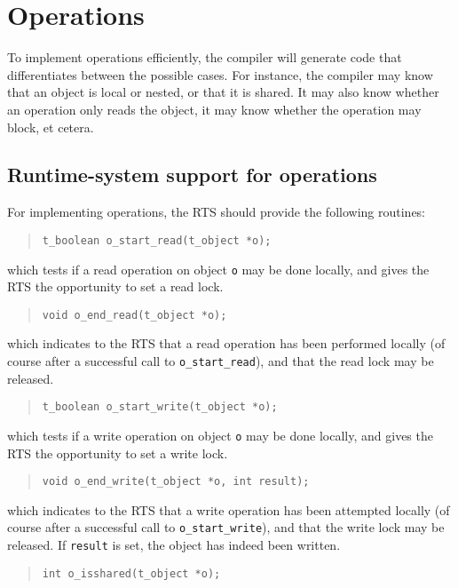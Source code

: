 \documentclass[10pt]{article}
\begin{document}
\section{Operations}\label{sec:ops}
To implement operations efficiently, the compiler will generate code
that differentiates between the possible cases.
For instance, the compiler may know that an object is local or nested,
or that it is shared.
It may also know whether an operation only reads the object, it may
know whether the operation may block, et cetera.

\subsection{Runtime-system support for operations}
For implementing operations, the RTS should provide the following routines:
\begin{quote}
\begin{verbatim}
t_boolean o_start_read(t_object *o);
\end{verbatim}
\end{quote}
which tests if a read operation on object \verb+o+ may be done locally,
and gives the RTS the opportunity to set a read lock.
\begin{quote}
\begin{verbatim}
void o_end_read(t_object *o);
\end{verbatim}
\end{quote}
which indicates to the RTS that a read operation has been performed locally
(of course after a successful call to \verb+o_start_read+), and that the read lock
may be released.
\begin{quote}
\begin{verbatim}
t_boolean o_start_write(t_object *o);
\end{verbatim}
\end{quote}
which tests if a write operation on object \verb+o+ may be done locally,
and gives the RTS the opportunity to set a write lock.
\begin{quote}
\begin{verbatim}
void o_end_write(t_object *o, int result);
\end{verbatim}
\end{quote}
which indicates to the RTS that a write operation has been attempted locally
(of course after a successful call to \verb+o_start_write+), and that the write lock
may be released.
If \verb+result+
is set, the object has indeed been written.
\begin{quote}
\begin{verbatim}
int o_isshared(t_object *o);
\end{verbatim}
\end{quote}
\end{document}

